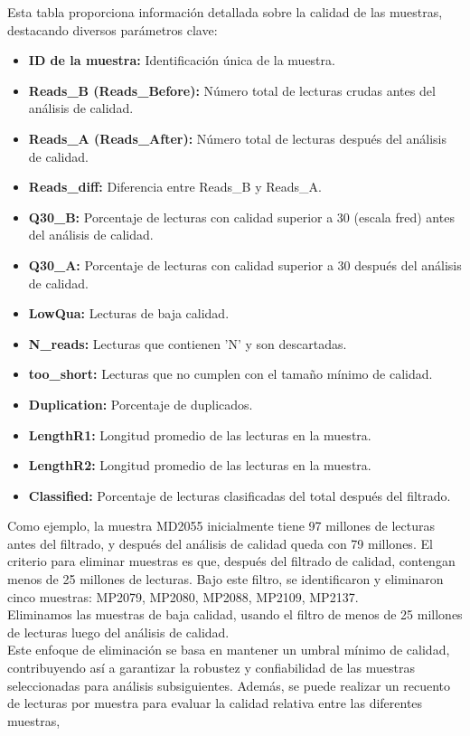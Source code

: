 Esta tabla proporciona información detallada sobre la calidad de las muestras, destacando diversos parámetros clave:
\begin{itemize}
  \item \textbf{ID de la muestra:} Identificación única de la muestra.
  \item \textbf{Reads\_B  (Reads\_Before):} Número total de lecturas crudas antes del análisis de calidad.
  \item \textbf{Reads\_A (Reads\_After):} Número total de lecturas después del análisis de calidad.
  \item \textbf{Reads\_diff:}  Diferencia entre Reads\_B y Reads\_A.
  \item \textbf{Q30\_B:} Porcentaje de lecturas con calidad superior a 30 (escala fred) antes del análisis de calidad.
  \item \textbf{Q30\_A:} Porcentaje de lecturas con calidad superior a 30 después del análisis de calidad.
  \item \textbf{LowQua:} Lecturas de baja calidad.
  \item \textbf{N\_reads:} Lecturas que contienen 'N' y son descartadas.
  \item \textbf{too\_short:}  Lecturas que no cumplen con el tamaño mínimo de calidad.
  \item \textbf{Duplication:} Porcentaje de duplicados.
  \item \textbf{LengthR1:} Longitud promedio de las lecturas en la muestra.
  \item \textbf{LengthR2:} Longitud promedio de las lecturas en la muestra.
  \item \textbf{Classified:} Porcentaje de lecturas clasificadas del total después del filtrado.
\end{itemize}

Como ejemplo, la muestra MD2055 inicialmente tiene 97 millones de lecturas antes del filtrado, y después del análisis de calidad queda con 79 millones. El criterio para eliminar muestras es que, después del filtrado de calidad, contengan menos de 25 millones de lecturas. Bajo este filtro, se identificaron y eliminaron cinco muestras: MP2079, MP2080, MP2088, MP2109, MP2137.\\

Eliminamos las muestras de baja calidad, usando el filtro de menos de 25 millones de lecturas luego del análisis de calidad.\\

Este enfoque de eliminación se basa en mantener un umbral mínimo de calidad, contribuyendo así a garantizar la robustez y confiabilidad de las muestras seleccionadas para análisis subsiguientes. Además, se puede realizar un recuento de lecturas por muestra para evaluar la calidad relativa entre las diferentes muestras,\\

